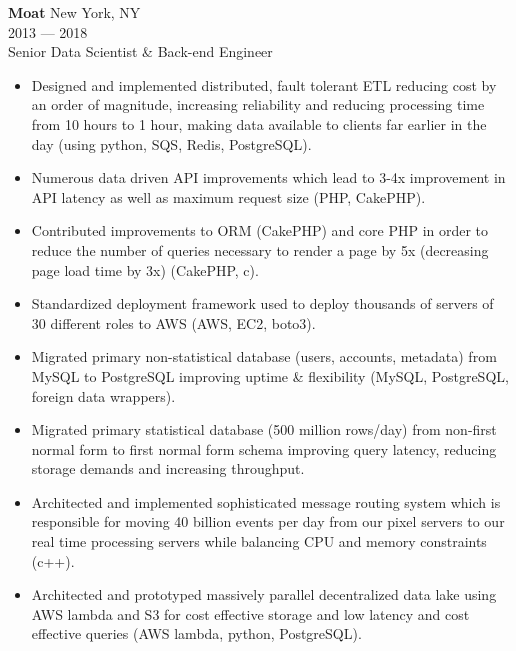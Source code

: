 \myfontsize{\bigheader}
\textbf{Moat}
\myfontsize{\bodysize}
New York, NY\\
2013 --- 2018\\
Senior Data Scientist \& Back-end Engineer\\

\begin{itemize}[topsep=1ex, partopsep=0ex, parsep=0ex, itemsep=0.5ex]
    \item Designed and implemented distributed, fault tolerant ETL reducing cost by an order of magnitude, increasing reliability and reducing processing time from {\mytilde}10 hours to {\mytilde}1 hour, making data available to clients far earlier in the day (using python, SQS, Redis, PostgreSQL).
    \item Numerous data driven API improvements which lead to 3-4x improvement in API latency as well as maximum request size (PHP, CakePHP).
    \item Contributed improvements to ORM (CakePHP) and core PHP in order to reduce the number of queries necessary to render a page by 5x (decreasing page load time by {\mytilde}3x) (CakePHP, c).
    \item Standardized deployment framework used to deploy thousands of servers of {\mytilde}30 different roles to AWS (AWS, EC2, boto3).
    \item Migrated primary non-statistical database (users, accounts, metadata) from MySQL to PostgreSQL improving uptime \& flexibility (MySQL, PostgreSQL, foreign data wrappers).
    \item Migrated primary statistical database (500 million rows/day) from non-first normal form to first normal form schema improving query latency, reducing storage demands and increasing throughput.
    \item Architected and implemented sophisticated message routing system which is responsible for moving {\mytilde}40 billion events per day from our pixel servers to our real time processing servers while balancing CPU and memory constraints (c++).
    \item Architected and prototyped massively parallel decentralized data lake using AWS lambda and S3 for cost effective storage and low latency and cost effective queries (AWS lambda, python, PostgreSQL).
\end{itemize}



